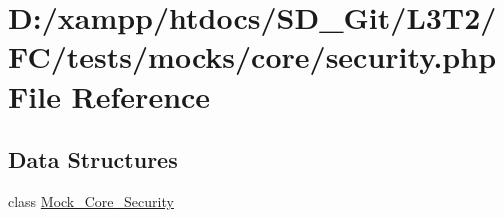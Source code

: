 \hypertarget{tests_2mocks_2core_2_security_8php}{}\section{D\+:/xampp/htdocs/\+S\+D\+\_\+\+Git/\+L3\+T2/\+F\+C/tests/mocks/core/security.php File Reference}
\label{tests_2mocks_2core_2_security_8php}
\subsection*{Data Structures}
\begin{DoxyCompactItemize}
\item 
class \hyperlink{class_mock___core___security}{Mock\+\_\+\+Core\+\_\+\+Security}
\end{DoxyCompactItemize}
